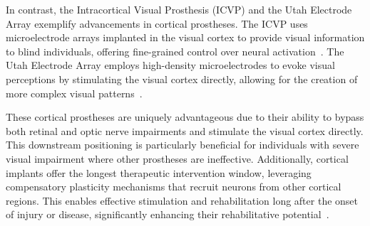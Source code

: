 \documentclass[twocolumn,10pt]{article}
\begin{document}
In contrast, the Intracortical Visual Prosthesis (ICVP) and the Utah Electrode Array exemplify advancements in cortical prostheses. The ICVP uses microelectrode arrays implanted in the visual cortex to provide visual information to blind individuals, offering fine-grained control over neural activation~\parencite{troykIntracorticalVisualProsthesis2005}. The Utah Electrode Array employs high-density microelectrodes to evoke visual perceptions by stimulating the visual cortex directly, allowing for the creation of more complex visual patterns~\parencite{normannClinicalApplicationsPenetrating2016}.

These cortical prostheses are uniquely advantageous due to their ability to bypass both retinal and optic nerve impairments and stimulate the visual cortex directly. This downstream positioning is particularly beneficial for individuals with severe visual impairment where other prostheses are ineffective. Additionally, cortical implants offer the longest therapeutic intervention window, leveraging compensatory plasticity mechanisms that recruit neurons from other cortical regions. This enables effective stimulation and rehabilitation long after the onset of injury or disease, significantly enhancing their rehabilitative potential~\parencite{tzekovGabelEdArtificial2020, beyelerLearningSeeAgain2017}.
\end{document}
